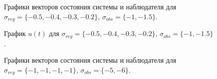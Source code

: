 \begin{figure}[!h]
	\caption{Графики векторов состояния системы и наблюдателя для $\sigma_{reg} = \{ -0.5, -0.4, -0.3, -0.2\}$, $\sigma_{obs}= \{-1, -1.5 \}$.}
	\label{3_x_k3l1}
\end{figure}

\begin{figure}[!h]
	\caption{График $u(t)$ для $\sigma_{reg} = \{ -0.5, -0.4, -0.3, -0.2\}$, $\sigma_{obs}= \{-1, -1.5 \}$.}
	\label{3_u_k3l1}
\end{figure}


\begin{figure}[!h]
	\caption{Графики векторов состояния системы и наблюдателя для $\sigma_{reg} = \{ -1, -1, -1, -1\}$, $\sigma_{obs}= \{-5, -6 \}$.}
	\label{3_x_k1l2}
\end{figure}

